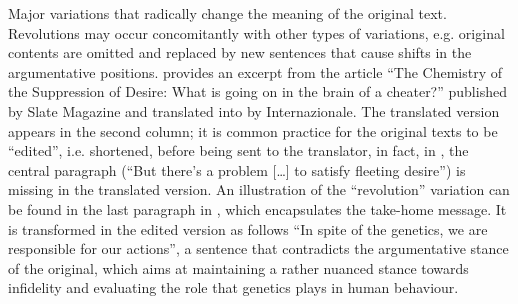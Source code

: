 \documentclass[output=paper]{LSP/langsci}
\begin{document}
Major variations that radically change the meaning of the original text. Revolutions may occur concomitantly with other types of variations, e.g. original contents are omitted and replaced by new sentences that cause shifts in the argumentative positions.  provides an excerpt from the article ``The Chemistry of the Suppression of Desire: What is going on in the brain of a cheater?'' published by Slate Magazine and translated into  by Internazionale. The translated version appears in the second column; it is common practice for the original texts to be ``edited'', i.e. shortened, before being sent to the translator, in fact, in  , the central paragraph (``But there's a problem [\ldots]  to satisfy fleeting desire'') is missing in the translated version. An illustration of the ``revolution'' variation can be found in the last paragraph in , which encapsulates the take-home message. It is transformed in the edited version as follows ``In spite of the genetics, we are responsible for our actions'', a sentence that contradicts the argumentative stance of the original, which aims at maintaining a rather nuanced stance towards infidelity and evaluating the role that genetics plays in human behaviour. 
\end{document}
